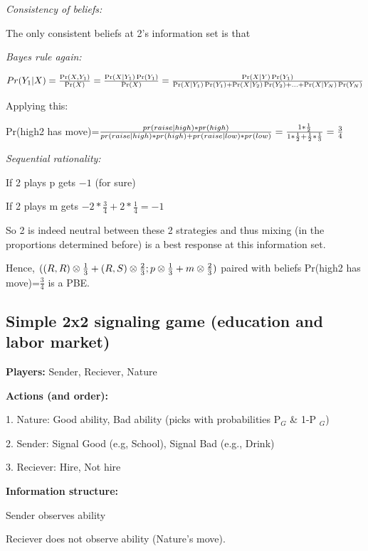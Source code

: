 \documentclass{article}
\begin{document}
\bigskip

\textit{Consistency of beliefs:}

The only consistent beliefs at 2's information set is that

\bigskip

\textit{Bayes rule again: }

$Pr(Y_{1}|X)=\frac{\Pr (X,Y_{1})}{\Pr (X)}=\frac{\Pr (X|Y_{1})\Pr (Y_{1})}{%
\Pr (X)}=\frac{\Pr (X|Y)\Pr (Y_{1})}{\Pr (X|Y_{1})\Pr (Y_{1})+\Pr
(X|Y_{2})\Pr (Y_{2})+...+\Pr (X|Y_{N})\Pr (Y_{N})}$

\bigskip

Applying this:

Pr(high\TEXTsymbol{\vert}2 has move)=$\frac{pr(raise|high)\ast pr(high)}{%
pr(raise|high)\ast pr(high)+pr(raise|low)\ast pr(low)}=\frac{1\ast \frac{1}{2%
}}{1\ast \frac{1}{2}+\frac{1}{2}\ast \frac{1}{3}}=\frac{3}{4}$

\textit{Sequential rationality:\ }

If 2 plays p gets $-1$ (for sure)

If 2 plays m gets $-2\ast \frac{3}{4}+2\ast \frac{1}{4}=\allowbreak -1$

\bigskip

So 2 is indeed neutral between these 2 strategies and thus mixing (in the
proportions determined before) is a best response at this information
set.\bigskip

Hence, $((R,R)\otimes \frac{1}{3}+(R,S)\otimes \frac{2}{3};p\otimes \frac{1}{%
3}+m\otimes \frac{2}{3})$ paired with beliefs Pr(high\TEXTsymbol{\vert}2 has
move)=$\frac{3}{4}$ is a PBE.

\subsection{Simple 2x2 signaling game (education and labor market)}

\textbf{Players: }Sender, Reciever, Nature\bigskip

\textbf{Actions (and order):}

1. Nature: Good ability, Bad ability (picks with probabilities P$_{G}$ \& 1-P%
$_{G}$)

2. Sender: Signal Good (e.g, School), Signal Bad (e.g., Drink)

3. Reciever: Hire, Not hire\bigskip

\textbf{Information structure:}

Sender observes ability

Reciever does not observe ability (Nature's move).
\end{document}
